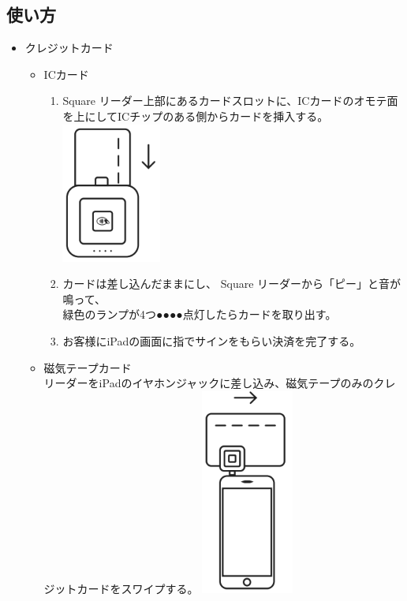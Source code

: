 \documentclass[a4paper]{ltjsreport}
\begin{document}
\subsection{使い方}
\begin{itemize}
  \item クレジットカード
        \begin{itemize}
          \item ICカード
                \begin{enumerate}[手順1]
                  \item Square リーダー上部にあるカードスロットに、ICカードのオモテ面を上にしてICチップのある側からカードを挿入する。\\
                        \includegraphics[scale=0.4]{assets/square_insert-card.png}
                  \item カードは差し込んだままにし、 Square リーダーから「ピー」と音が鳴って、\\緑色のランプが4つ{\color{green}●●●●}点灯したらカードを取り出す。
                  \item お客様にiPadの画面に指でサインをもらい決済を完了する。
                \end{enumerate}
          \item 磁気テープカード\\
                リーダーをiPadのイヤホンジャックに差し込み、磁気テープのみのクレジットカードをスワイプする。
                \includegraphics[scale=0.4]{assets/square_slide-card.png}

\end{itemize}
\end{itemize}
\end{document}
